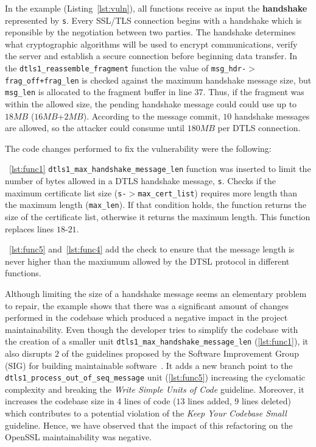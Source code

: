 \documentclass[10pt,conference]{IEEEtran}
\begin{document}
In the example (Listing~\ref{lst:vuln}), all functions receive as input the \textbf{handshake} represented by \texttt{s}. Every SSL/TLS connection begins with a handshake which is reponsible by the negotiation between two parties. The handshake determines what cryptographic algorithms will be used to encrypt communications, verify the server and establish a secure connection before beginning data transfer. In the \texttt{dtls1\_reassemble\_fragment} function the value of
\texttt{msg\_hdr-$>$frag\_off+frag\_len} is checked against the maximum
handshake message size, but \texttt{msg\_len} is allocated to the fragment
buffer in line $37$. Thus, if the fragment was within the allowed size, the
pending handshake message could could use up to $18MB$ ($16MB$+$2MB$). According to the
message commit, $10$ handshake messages are allowed, so the attacker could
consume until $180MB$ per DTLS connection.

The code changes performed to fix the vulnerability were the following:

~\ref{lst:func1} \texttt{dtls1\_max\_handshake\_message\_len} function was inserted to limit the number of bytes allowed in a DTLS handshake message,
\texttt{s}. Checks if the maximum certificate list size
(\texttt{s-$>$max\_cert\_list}) requires more length than the maximum length
(\texttt{max\_len}). If that condition holds, the function returns the size of
the certificate list, otherwise it returns the maximum length. This function replaces lines $18$-$21$.

~\ref{lst:func5} and~\ref{lst:func4} add the check to ensure that the message
length is never higher than the maxiumum allowed by the DTSL protocol in
different functions.

Although limiting the size of a handshake message seems an elementary problem to
repair, the example shows that there was a significant amount of changes
performed in the codebase which produced a negative impact in the project
maintainability. Even though the developer tries to simplify the codebase with
the creation of a smaller unit \texttt{dtls1\_max\_handshake\_message\_len} (\ref{lst:func1}), it
also disrupts $2$ of the guidelines proposed by the Software Improvement Group
(SIG) for building maintainable software~\cite{Visser:2016:OREILLY}. It adds a
new branch point to the \texttt{dtls1\_process\_out\_of\_seq\_message} unit
(\ref{lst:func5}) increasing the cyclomatic complexity and breaking the
\emph{Write Simple Units of Code} guideline. Moreover, it increases the codebase
size in $4$ lines of code ($13$ lines added, $9$ lines deleted) which contributes
to a potential violation of the
\emph{Keep Your Codebase Small} guideline. Hence, we have observed that the
impact of this refactoring on the OpenSSL maintainability was negative.
\end{document}
